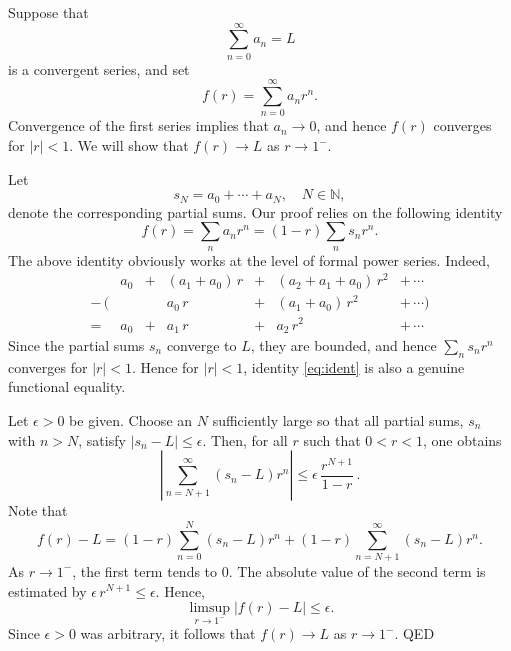 \documentclass[12pt]{article}
\newcommand{\natnums}{\mathbb{N}}
\begin{document}
Suppose that
$$\sum_{n=0}^\infty a_n=L$$
is a convergent series, and set
$$f(r) = \sum_{n=0}^\infty a_n r^n.$$
Convergence of the first series implies that $a_n\rightarrow 0$, and
hence $f(r)$ converges for $|r|<1$.  We will show that
$f(r)\rightarrow L$ as $r\rightarrow 1^-$.

Let $$s_N=a_0+\cdots+a_N,\quad N\in\natnums,$$
denote the corresponding partial sums.  Our proof relies on the
following identity
\begin{equation}
  \label{eq:ident}
  f(r)=\sum_n a_n r^n = (1-r) \sum_n s_n r^n.  
\end{equation}
The above identity obviously works at the level of formal power
series.  Indeed,
$$
\begin{array}{crcrcrc}
   &a_0 &+& (a_1+a_0)\, r &+& (a_2+a_1+a_0)\,r^2 &+\, \cdots \\
- \,( &    && a_0\, r &+& (a_1+a_0)\,r^2 &+\,\cdots )\\
=   &a_0 &+& a_1\, r &+& a_2\, r^2 &+\, \cdots
\end{array}
$$
Since the partial sums $s_n$ converge to $L$, they are bounded, and
hence $\sum_n s_n r^n$ converges for $|r|<1$.  Hence for $|r|<1$, identity
\eqref{eq:ident} is also a genuine functional equality.

Let $\epsilon>0$ be given. Choose an $N$ sufficiently large so that
all partial sums, $s_n$ with $n>N$, satisfy $|s_n-L|\le\epsilon$. Then, for all
$r$ such that $0<r<1$, one obtains
$$\left|\sum_{n=N+1}^\infty (s_n - L) r^n\right| \le
\epsilon\,\frac{r^{N+1}}{1-r}\,.$$
Note that
$$f(r) - L = (1-r)\sum_{n=0}^N (s_n - L) r^n
+ (1-r) \sum_{n=N+1}^\infty (s_n - L) r^n.$$
As $r\rightarrow 1^-$, the first term tends to $0$. The absolute value of the
second term is estimated by $\epsilon\, r^{N+1}\le \epsilon$. Hence,
$$\limsup_{r\rightarrow 1^-} |f(r) - L| \le \epsilon.$$ Since $\epsilon>0$ was
arbitrary, it follows that $f(r)\rightarrow L$ as $r\rightarrow 1^-$.
QED

\end{document}
